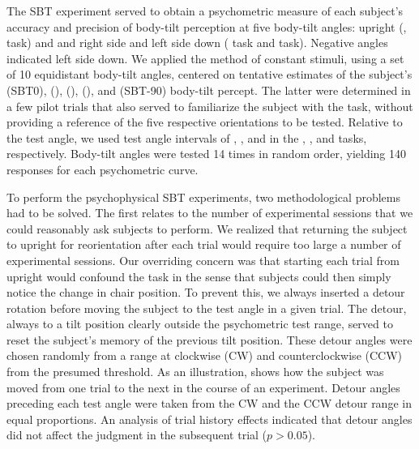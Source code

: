 The SBT experiment served to obtain a psychometric measure of each subject's accuracy and precision of body-tilt perception at five body-tilt angles: upright (,  task) and  and  right side and left side down ( task and  task). Negative angles indicated left side down. We applied the method of constant stimuli, using a set of 10 equidistant body-tilt angles, centered on tentative estimates of the subject's  (SBT0),  (),  (),  (), and  (SBT-90) body-tilt percept. The latter were determined in a few pilot trials that also served to familiarize the subject with the task, without providing a reference of the five respective orientations to be tested. Relative to the test angle, we used test angle intervals of , , and  in the , , and  tasks, respectively. Body-tilt angles were tested 14 times in random order, yielding 140 responses for each psychometric curve. 

To perform the psychophysical SBT experiments, two methodological problems had to be solved. The first relates to the number of experimental sessions that we could reasonably ask subjects to perform. We realized that returning the subject to upright for reorientation after each trial would require too large a number of experimental sessions. Our overriding concern was that starting each trial from upright would confound the  task in the sense that subjects could then simply notice the change in chair position. To prevent this, we always inserted a detour rotation before moving the subject to the test angle in a given trial. The detour, always to a tilt position clearly outside the psychometric test range, served to reset the subject's memory of the previous tilt position. These detour angles were chosen randomly from a range at  clockwise (CW) and counterclockwise (CCW) from the presumed threshold. As an illustration,  shows how the subject was moved from one trial to the next in the course of an  experiment. Detour angles preceding each test angle were taken from the CW and the CCW detour range in equal proportions. An analysis of trial history effects indicated that detour angles did not affect the judgment in the subsequent trial ($p > 0.05$). 

